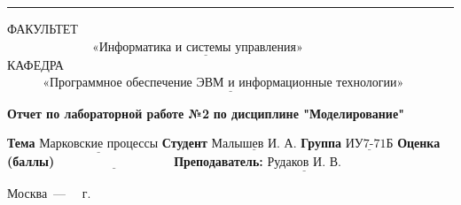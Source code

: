 \documentclass[12pt]{report}
\begin{document}
\begin{titlepage}
		\noindent\rule{18cm}{3pt}
		\newline\newline
		\noindent ФАКУЛЬТЕТ $\underline{~~~~~~~~~~~~~~~~~~~~~~~~~~~~~~~\text{«Информатика и системы управления»}~~~~~~~~~~~~~~~~~~~~~~~~~~~~~~~~~~~~~}$ \newline\newline
		\noindent КАФЕДРА $\underline{~~~~~~~~~~~~~\text{«Программное обеспечение ЭВМ и информационные технологии»}~~~~~~~~~~~~~~~~~~~~~~~}$\newline\newline\newline\newline\newline\newline\newline\newline\newline\newline\newline
		
		
		\begin{center}
			\noindent\begin{minipage}{1.3\textwidth}\centering
				\Large\textbf{  Отчет по лабораторной работе №2}\newline
				\textbf{по дисциплине \newline "Моделирование"}\newline\newline
			\end{minipage}
		\end{center}
		
		\noindent\textbf{Тема} $\underline{\text{Марковские процессы}}$\newline\newline
		\noindent\textbf{Студент} $\underline{\text{Малышев И. А.}}$\newline\newline
		\noindent\textbf{Группа} $\underline{\text{ИУ7-71Б}}$\newline\newline
		\noindent\textbf{Оценка (баллы)} $\underline{\text{~~~~~~~~~~~~~~~~~~~~~~~~~~~}}$\newline\newline
		\noindent\textbf{Преподаватель: } $\underline{\text{Рудаков И. В.}}$\newline\newline\newline
		
		\begin{center}
			\vfill
			Москва~---~\the\year
			~г.
		\end{center}
	\end{titlepage}
	
\end{document}
